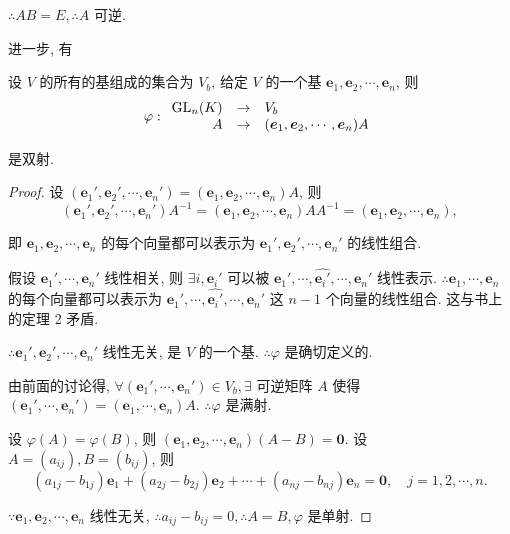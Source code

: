 \documentclass[color=black,device=normal,lang=cn,mode=geye]{elegantnote}
\begin{document}
$\therefore AB=E,\therefore A$ 可逆.

进一步, 有
\begin{theorem}\label{t1.1}
    设 $V$ 的所有的基组成的集合为 $V_b$, 给定 $V$ 的一个基 $\boldsymbol{e}_1,\boldsymbol{e}_2,\cdots,\boldsymbol{e}_n$, 则
    \[\varphi:\begin{array}{rcl}
        \operatorname{GL} _n(K) & \to & V_b \\
        A & \to & (\boldsymbol{e}_1,\boldsymbol{e}_2,\cdots,\boldsymbol{e}_n)A \\
    \end{array}\]

    是双射.
\end{theorem}
\begin{proof}
    设 $(\boldsymbol{e}_1',\boldsymbol{e}_2',\cdots,\boldsymbol{e}_n')=(\boldsymbol{e}_1,\boldsymbol{e}_2,\cdots,\boldsymbol{e}_n)A$, 则
    \[(\boldsymbol{e}_1',\boldsymbol{e}_2',\cdots,\boldsymbol{e}_n')A^{-1}=(\boldsymbol{e}_1,\boldsymbol{e}_2,\cdots,\boldsymbol{e}_n)AA^{-1}=(\boldsymbol{e}_1,\boldsymbol{e}_2,\cdots,\boldsymbol{e}_n),\]

    即 $\boldsymbol{e}_1,\boldsymbol{e}_2,\cdots,\boldsymbol{e}_n$ 的每个向量都可以表示为 $\boldsymbol{e}_1',\boldsymbol{e}_2',\cdots,\boldsymbol{e}_n'$ 的线性组合.

    假设 $\boldsymbol{e}_1',\cdots,\boldsymbol{e}_n'$ 线性相关, 则 $\exists i,\boldsymbol{e}_i'$ 可以被 $\boldsymbol{e}_1',\cdots,\widehat{\boldsymbol{e}_i'},\cdots,\boldsymbol{e}_n'$ 线性表示. $\therefore\boldsymbol{e}_1,\cdots,\boldsymbol{e}_n$ 的每个向量都可以表示为 $\boldsymbol{e}_1',\cdots,\widehat{\boldsymbol{e}_i'},\cdots,\boldsymbol{e}_n'$ 这 $n-1$ 个向量的线性组合. 这与书上的定理 2 矛盾.

    $\therefore\boldsymbol{e}_1',\boldsymbol{e}_2',\cdots,\boldsymbol{e}_n'$ 线性无关, 是 $V$ 的一个基. $\therefore\varphi$ 是确切定义的.

    由前面的讨论得, $\forall(\boldsymbol{e}_1',\cdots,\boldsymbol{e}_n')\in V_b,\exists$ 可逆矩阵 $A$ 使得 $(\boldsymbol{e}_1',\cdots,\boldsymbol{e}_n')=(\boldsymbol{e}_1,\cdots,\boldsymbol{e}_n)A$. $\therefore\varphi$ 是满射.

    设 $\varphi(A)=\varphi(B)$, 则 $(\boldsymbol{e}_1,\boldsymbol{e}_2,\cdots,\boldsymbol{e}_n)(A-B)=\boldsymbol{0}$. 设 $A=(a_{ij}),B=(b_{ij})$, 则
    \[(a_{1j}-b_{1j})\boldsymbol{e}_1+(a_{2j}-b_{2j})\boldsymbol{e}_2+\cdots+(a_{nj}-b_{nj})\boldsymbol{e}_n=\boldsymbol{0},\quad j=1,2,\cdots,n.\]

    $\because\boldsymbol{e}_1,\boldsymbol{e}_2,\cdots,\boldsymbol{e}_n$ 线性无关, $\therefore a_{ij}-b_{ij}=0,\therefore A=B,\varphi$ 是单射.
\end{proof}
\end{document}
